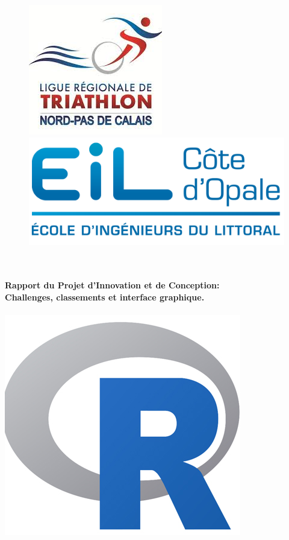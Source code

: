 \begin{titlepage}
  \begin{sffamily}
  \begin{center}
\begin{figure}
\includegraphics[scale=0.8]{img/logo_png.png} \hfill
\includegraphics[scale=0.7]{img/eilco.png} 
\end{figure}
    \textsc{\Large }\\[1.5cm]
    \HRule \\[0.4cm]
    { \huge \bfseries Rapport du Projet d'Innovation et de Conception:\\Challenges, classements et interface graphique.\\
    	[0.4cm] }
	\textsc{\Large}
    \HRule \\[2cm]
    \includegraphics[scale=0.4]{img/R_logo.png}\\[2cm]


\end{center}
\end{sffamily}
\end{titlepage}
